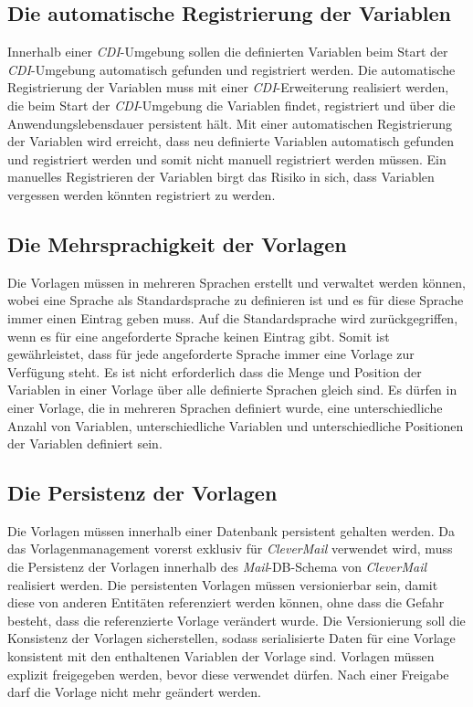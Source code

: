 \subsection{Die automatische Registrierung der Variablen}
Innerhalb einer \emph{CDI}-Umgebung sollen die definierten Variablen beim Start der \emph{CDI}-Umgebung automatisch gefunden und registriert werden. Die automatische Registrierung der Variablen muss mit einer \emph{CDI}-Erweiterung realisiert werden, die beim Start der \emph{CDI}-Umgebung die Variablen findet, registriert und über die Anwendungslebensdauer persistent hält. Mit einer automatischen Registrierung der Variablen wird erreicht, dass neu definierte Variablen automatisch gefunden und registriert werden und somit nicht manuell registriert werden müssen. Ein manuelles Registrieren der Variablen birgt das Risiko in sich, dass Variablen vergessen werden könnten registriert zu werden.

\subsection{Die Mehrsprachigkeit der Vorlagen}
Die Vorlagen müssen in mehreren Sprachen erstellt und verwaltet werden können, wobei eine Sprache als Standardsprache zu definieren ist und es für diese Sprache immer einen Eintrag geben muss. Auf die Standardsprache wird zurückgegriffen, wenn es für eine angeforderte Sprache keinen Eintrag gibt. Somit ist gewährleistet, dass für jede angeforderte Sprache immer eine Vorlage zur Verfügung steht. Es ist nicht erforderlich dass die Menge und Position der Variablen in einer Vorlage über alle definierte Sprachen gleich sind. Es dürfen in einer Vorlage, die in mehreren Sprachen definiert wurde, eine unterschiedliche Anzahl von Variablen, unterschiedliche Variablen  und unterschiedliche Positionen der Variablen definiert sein.

\subsection{Die Persistenz der Vorlagen}
\label{sec:sub-template-variable-persistenz}
Die Vorlagen müssen innerhalb einer Datenbank persistent gehalten werden. Da das Vorlagenmanagement vorerst exklusiv für \emph{CleverMail} verwendet wird, muss die Persistenz der Vorlagen innerhalb des \emph{Mail}-DB-Schema von \emph{CleverMail} realisiert werden. Die persistenten Vorlagen müssen versionierbar sein, damit diese von anderen Entitäten referenziert werden können, ohne dass die Gefahr besteht, dass die referenzierte Vorlage verändert wurde.    Die Versionierung soll die Konsistenz der Vorlagen sicherstellen, sodass serialisierte Daten für eine Vorlage konsistent mit den enthaltenen Variablen der Vorlage sind. Vorlagen müssen explizit freigegeben werden, bevor diese verwendet dürfen. Nach einer Freigabe darf die Vorlage nicht mehr geändert werden.

